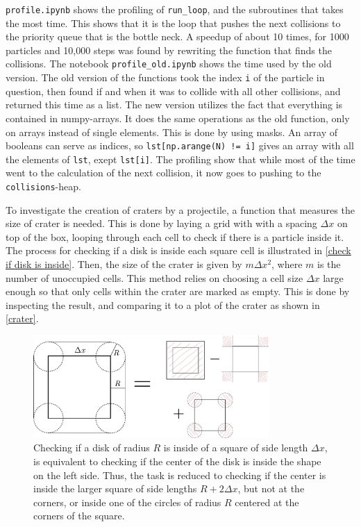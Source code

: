 \documentclass{article}
\begin{document}
    \verb|profile.ipynb| shows the profiling of \verb|run_loop|, and the subroutines that takes the most time.
    This shows that it is the loop that pushes the next collisions to the priority queue that is the bottle neck.
    A speedup of about 10 times, for 1000 particles and 10,000 steps was found by rewriting the function that finds the collisions.
    The notebook \verb|profile_old.ipynb| shows the time used by the old version.
    The old version of the functions took the index \verb|i| of the particle in question, then found if and when it was to collide with all other collisions, and returned this time as a list.
    The new version utilizes the fact that everything is contained in numpy-arrays.
    It does the same operations as the old function, only on arrays instead of single elements.
    This is done by using masks.
    An array of booleans can serve as indices, so \verb|lst[np.arange(N) != i]| gives an array with all the elements of \verb|lst|, exept \verb|lst[i]|.
    The profiling show that while most of the time went to the calculation of the next collision, it now goes to pushing to the \verb|collisions|-heap.

    To investigate the creation of craters by a projectile, a function that measures the size of crater is needed.
    This is done by laying a grid with with a spacing $\Delta x$ on top of the box, looping through each cell to check if there is a particle inside it.
    The process for checking if a disk is inside each square cell is illustrated in \autoref{check if disk is inside}.
    Then, the size of the crater is given by $m \Delta x^2$, where $m$ is the number of unoccupied cells.
    This method relies on choosing a cell size $\Delta x$ large enough so that only cells within the crater are marked as empty.
    This is done by inspecting the result, and comparing it to a plot of the crater as shown in \autoref{crater}.


    \begin{figure}[H]
        \centering
        \includegraphics[width=0.8\textwidth]{figure.pdf}
        \caption{Checking if a disk of radius $R$ is inside of a square of side length $\Delta x$, is equivalent to checking if the center of the disk is inside the shape on the left side.
        Thus, the task is reduced to checking if the center is inside the larger square of side lengths $R + 2 \Delta x$, but not at the corners, or inside one of the circles of radius $R$ centered at the corners of the square.}
        \label{check if disk is inside}
    \end{figure}
\end{document}
